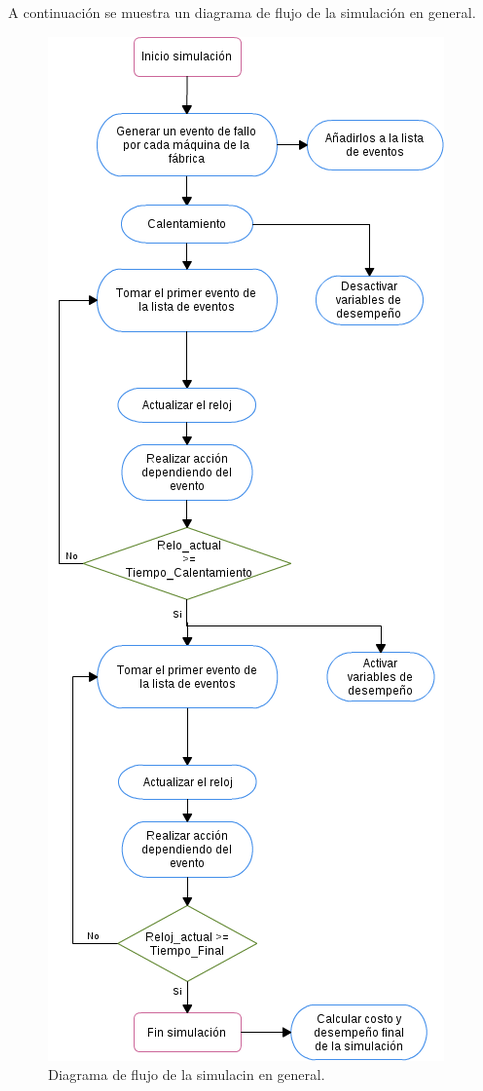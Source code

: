 \documentclass[10pt]{article}
\begin{document}
A continuación se muestra un diagrama de flujo de la simulación en general.\\

\begin{figure}
  \centering
    \includegraphics[scale=0.6]{Simulacion_flujo.png}
  \caption{Diagrama de flujo de la simulacin en general.}
  \label{fig:simulacion}
\end{figure}
\end{document}
